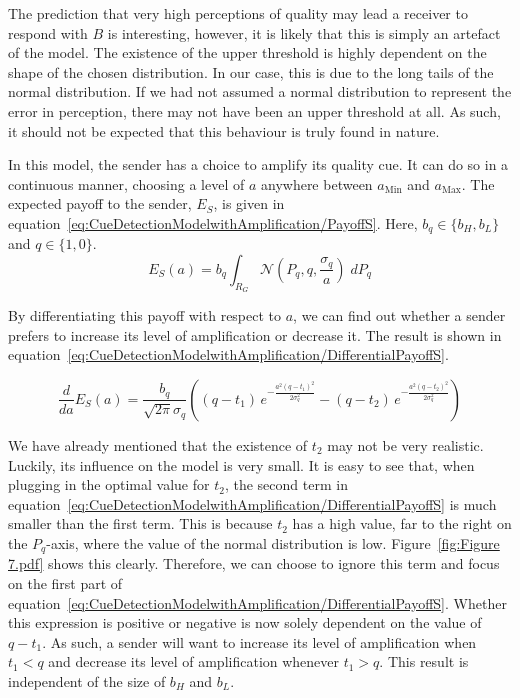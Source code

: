 \documentclass[a4paper,12pt]{article}
\numberwithin{equation}{section}
\numberwithin{figure}{section}
\begin{document}
The prediction that very high perceptions of quality may lead a receiver to respond with $B$ is interesting, however, it is likely that this is simply an artefact of the model. The existence of the upper threshold is highly dependent on the shape of the chosen distribution. In our case, this is due to the long tails of the normal distribution. If we had not assumed a normal distribution to represent the error in perception, there may not have been an upper threshold at all. As such, it should not be expected that this behaviour is truly found in nature.

In this model, the sender has a choice to amplify its quality cue. It can do so in a continuous manner, choosing a level of $a$ anywhere between $a_{\text{Min}}$ and $a_{\text{Max}}$. The expected payoff to the sender, $E_{S}$, is given in equation~\ref{eq:CueDetectionModelwithAmplification/PayoffS}. Here, $b_{q} \in \{b_{H}, b_{L}\}$ and $q \in \{1, 0\}$.
\begin{equation}
\label{eq:CueDetectionModelwithAmplification/PayoffS}
E_{S}(a) = b_{q} \displaystyle \int_{R_{G}} \mathcal{N}(P_{q}, q, \frac{\sigma_{q}}{a}) \; dP_{q}
\end{equation}

By differentiating this payoff with respect to $a$, we can find out whether a sender prefers to increase its level of amplification or decrease it. The result is shown in equation~\ref{eq:CueDetectionModelwithAmplification/DifferentialPayoffS}.

\begin{equation}
\label{eq:CueDetectionModelwithAmplification/DifferentialPayoffS}
\frac{d}{da} E_{S}(a) = \frac{b_{q}}{\sqrt{2 \pi} \sigma_{q}} \left( (q-t_{1}) \, e^{-\frac{a^{2} (q-t_{1})^2}{2 \sigma_{q}^2}} - (q-t_{2}) \, e^{-\frac{a^{2} (q-t_{2})^2}{2 \sigma_{q}^2}} \right)
\end{equation}

We have already mentioned that the existence of $t_{2}$ may not be very realistic. Luckily, its influence on the model is very small. It is easy to see that, when plugging in the optimal value for $t_{2}$, the second term in equation~\ref{eq:CueDetectionModelwithAmplification/DifferentialPayoffS} is much smaller than the first term. This is because $t_{2}$ has a high value, far to the right on the $P_{q}$-axis, where the value of the normal distribution is low. Figure~\ref{fig:Figure 7.pdf} shows this clearly. Therefore, we can choose to ignore this term and focus on the first part of equation~\ref{eq:CueDetectionModelwithAmplification/DifferentialPayoffS}. Whether this expression is positive or negative is now solely dependent on the value of $q-t_{1}$. As such, a sender will want to increase its level of amplification when $t_{1}<q$ and decrease its level of amplification whenever $t_{1}>q$. This result is independent of the size of $b_{H}$ and $b_{L}$.
\end{document}

